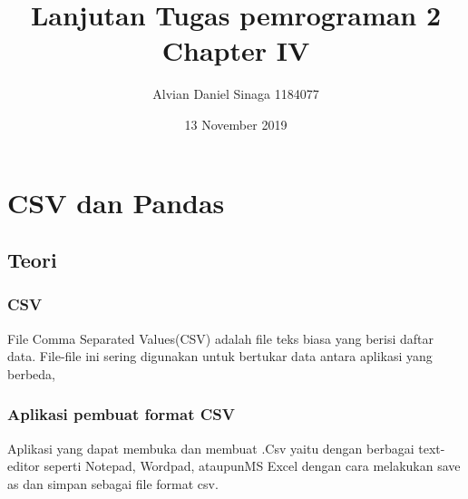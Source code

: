 \documentclass[a4paper,12pt]{report}
\title{Lanjutan Tugas pemrograman 2 Chapter IV}
\author{Alvian Daniel Sinaga 1184077}
\date{13 November 2019}
\begin{document}
\maketitle
\chapter{CSV dan Pandas}
\section{Teori}
\subsection{CSV}
File Comma Separated Values(CSV) adalah file teks biasa yang berisi daftar data. File-file ini sering digunakan untuk bertukar data antara aplikasi yang berbeda, 
\subsection{Aplikasi pembuat format CSV}
Aplikasi yang dapat membuka dan membuat .Csv yaitu dengan berbagai text-editor seperti Notepad, Wordpad, ataupunMS Excel dengan cara melakukan save as dan simpan sebagai file format csv.
\end{document}
